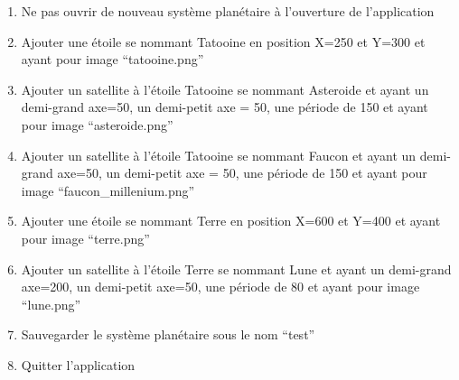\documentclass[a4paper,10pt]{article}
\begin{document}
\begin{enumerate}
 \item Ne pas ouvrir de nouveau système planétaire à l'ouverture de l'application
 \item Ajouter une étoile se nommant Tatooine en position X=250 et Y=300 et ayant pour image ``tatooine.png''
 \item Ajouter un satellite à l'étoile Tatooine se nommant Asteroide et ayant un demi-grand axe=50, un demi-petit axe = 50, une période 
 de 150 et ayant pour image ``asteroide.png'' 
 \item Ajouter un satellite à l'étoile Tatooine se nommant Faucon et ayant un demi-grand axe=50, un demi-petit axe = 50, une période 
de 150 et ayant pour image ``faucon\_millenium.png''
 \item Ajouter une étoile se nommant Terre en position X=600 et Y=400 et ayant pour image ``terre.png''
 \item Ajouter un satellite à l'étoile Terre se nommant Lune et ayant un demi-grand axe=200, un demi-petit axe=50, une période 
 de 80 et ayant pour image ``lune.png''
 \item Sauvegarder le système planétaire sous le nom ``test''
 \item Quitter l'application
\end{enumerate}

\newpage
{}
\end{document}
